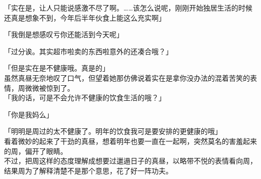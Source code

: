 「实在是，让人只能说感激不尽了啊。……该怎么说呢，刚刚开始独居生活的时候还真是想象不到，今年后半年伙食上能这么充实啊」

「我倒是想感叹亏你还能活到今天呢」

「过分诶。其实超市啦卖的东西啦意外的还凑合哦？」

「但是实在是不健康哦。真是的」\\

虽然真昼无奈地叹了口气，但望着她那仿佛说着实在是拿你没办法的混着苦笑的表情，周微微被惊到了。\\

「我的话，可是不会允许不健康的饮食生活的哦？」

「你是我妈么」

「明明是周过的太不健康了。明年的饮食我可是要安排的更健康的哦」\\

看着微妙的起来了干劲的真昼，想着明年也要一直在一起啊，突然莫名的害羞起来的周，偏开了眼睛。\\

不过，把周这样的态度理解成想要过邋遢日子的真昼，以略带不悦的表情看向周，结果周为了解释清楚不是那个意思，花了好一阵功夫。
